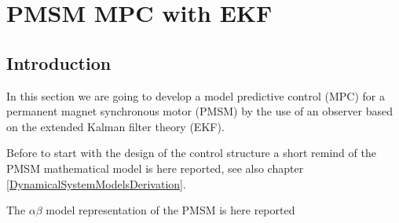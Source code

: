 \documentclass[11pt,a4paper,oneside]{book}
\numberwithin{equation}{section}
\theoremstyle{it}
\theoremstyle{definition}
\begin{document}
\section{PMSM MPC with EKF}
\subsection{Introduction}
In this section we are going to develop a model predictive control (MPC) for a 
permanent magnet synchronous motor (PMSM) by the use of an observer based on 
the extended Kalman filter theory (EKF). 

Before to start with the design of the control structure a short remind of the PMSM mathematical model is here reported, see also chapter \ref{DynamicalSystemModelsDerivation}.

The $\alpha\beta$ model representation of the PMSM is here reported
\end{document}
